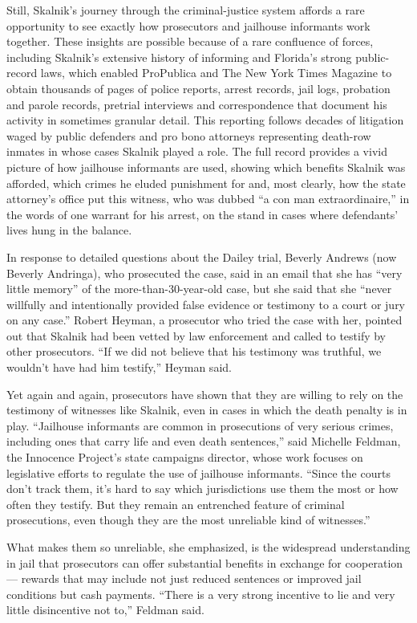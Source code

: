 Still, Skalnik's journey through the criminal-justice system affords a
rare opportunity to see exactly how prosecutors and jailhouse informants
work together. These insights are possible because of a rare confluence
of forces, including Skalnik's extensive history of informing and
Florida's strong public-record laws, which enabled ProPublica and The
New York Times Magazine to obtain thousands of pages of police reports,
arrest records, jail logs, probation and parole records, pretrial
interviews and correspondence that document his activity in sometimes
granular detail. This reporting follows decades of litigation waged by
public defenders and pro bono attorneys representing death-row inmates
in whose cases Skalnik played a role. The full record provides a vivid
picture of how jailhouse informants are used, showing which benefits
Skalnik was afforded, which crimes he eluded punishment for and, most
clearly, how the state attorney's office put this witness, who was
dubbed ``a con man extraordinaire,'' in the words of one warrant for his
arrest, on the stand in cases where defendants' lives hung in the
balance.

In response to detailed questions about the Dailey trial, Beverly
Andrews (now Beverly Andringa), who prosecuted the case, said in an
email that she has ``very little memory'' of the more-than-30-year-old
case, but she said that she ``never willfully and intentionally provided
false evidence or testimony to a court or jury on any case.'' Robert
Heyman, a prosecutor who tried the case with her, pointed out that
Skalnik had been vetted by law enforcement and called to testify by
other prosecutors. ``If we did not believe that his testimony was
truthful, we wouldn't have had him testify,'' Heyman said.

Yet again and again, prosecutors have shown that they are willing to
rely on the testimony of witnesses like Skalnik, even in cases in which
the death penalty is in play. ``Jailhouse informants are common in
prosecutions of very serious crimes, including ones that carry life and
even death sentences,'' said Michelle Feldman, the Innocence Project's
state campaigns director, whose work focuses on legislative efforts to
regulate the use of jailhouse informants. ``Since the courts don't track
them, it's hard to say which jurisdictions use them the most or how
often they testify. But they remain an entrenched feature of criminal
prosecutions, even though they are the most unreliable kind of
witnesses.''

What makes them so unreliable, she emphasized, is the widespread
understanding in jail that prosecutors can offer substantial benefits in
exchange for cooperation --- rewards that may include not just reduced
sentences or improved jail conditions but cash payments. ``There is a
very strong incentive to lie and very little disincentive not to,''
Feldman said.

